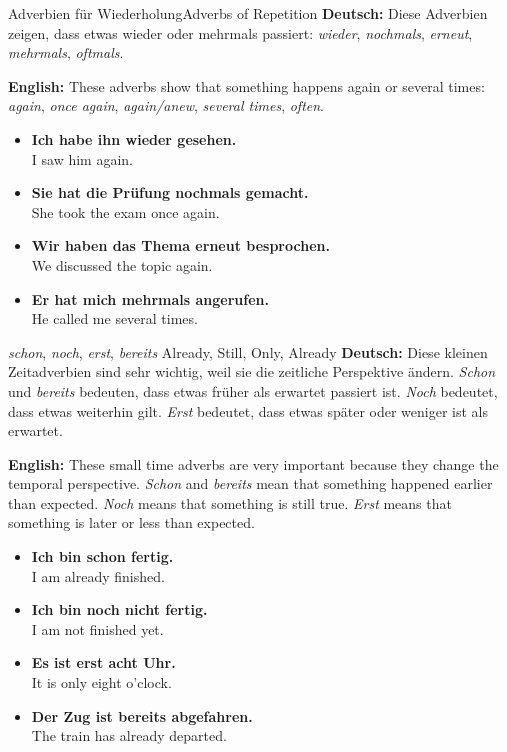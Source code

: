 \documentclass[a4paper,11pt]{article}
\newcommand{\GermanText}[1]{\textbf{Deutsch: }#1\par}
\newcommand{\EnglishText}[1]{{\color{SoftGray}\textbf{English: }#1\par}}
\newcommand{\ExampleItem}[2]{\item \textbf{#1}\\{\color{SoftGray}#2}}
\begin{document}
\begin{grammarentry}{Adverbien für Wiederholung}{Adverbs of Repetition}
    \GermanText{Diese Adverbien zeigen, dass etwas wieder oder mehrmals passiert: \textit{wieder}, \textit{nochmals}, \textit{erneut}, \textit{mehrmals}, \textit{oftmals}.}
    \EnglishText{These adverbs show that something happens again or several times: \textit{again}, \textit{once again}, \textit{again/anew}, \textit{several times}, \textit{often}.}
    \begin{exbox}
        \begin{itemize}
            \ExampleItem{Ich habe ihn wieder gesehen.}{I saw him again.}
            \ExampleItem{Sie hat die Prüfung nochmals gemacht.}{She took the exam once again.}
            \ExampleItem{Wir haben das Thema erneut besprochen.}{We discussed the topic again.}
            \ExampleItem{Er hat mich mehrmals angerufen.}{He called me several times.}
        \end{itemize}
    \end{exbox}
\end{grammarentry}

\begin{grammarentry}{
\textit{schon}, \textit{noch}, \textit{erst}, \textit{bereits}
}{Already, Still, Only, Already}
    \GermanText{Diese kleinen Zeitadverbien sind sehr wichtig, weil sie die zeitliche Perspektive ändern. \textit{Schon} und \textit{bereits} bedeuten, dass etwas früher als erwartet passiert ist. \textit{Noch} bedeutet, dass etwas weiterhin gilt. \textit{Erst} bedeutet, dass etwas später oder weniger ist als erwartet.}
    \EnglishText{These small time adverbs are very important because they change the temporal perspective. \textit{Schon} and \textit{bereits} mean that something happened earlier than expected. \textit{Noch} means that something is still true. \textit{Erst} means that something is later or less than expected.}
    \begin{exbox}
        \begin{itemize}
            \ExampleItem{Ich bin schon fertig.}{I am already finished.}
            \ExampleItem{Ich bin noch nicht fertig.}{I am not finished yet.}
            \ExampleItem{Es ist erst acht Uhr.}{It is only eight o'clock.}
            \ExampleItem{Der Zug ist bereits abgefahren.}{The train has already departed.}
        \end{itemize}
    \end{exbox}
\end{grammarentry}
\end{document}

